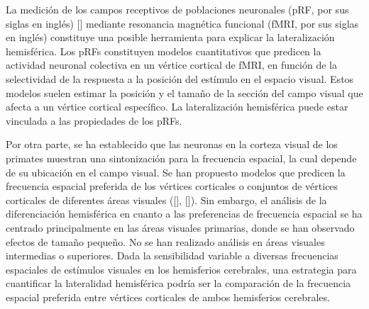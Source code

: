 

La medición de los campos receptivos de poblaciones neuronales (pRF, por sus siglas en ingl\'es) [\cite{dumoulin_population_2008}] mediante resonancia magnética funcional (fMRI, por sus siglas en ingl\'es) constituye una posible herramienta para explicar la lateralización hemisférica. Los pRFs constituyen modelos cuantitativos que predicen la actividad neuronal colectiva en un v\'ertice cortical de fMRI, en función de la selectividad de la respuesta a la posición del estímulo en el espacio visual. Estos modelos suelen estimar la posición y el tamaño de la sección del campo visual que afecta a un v\'ertice cortical específico. La lateralización hemisférica puede estar vinculada a las propiedades de los pRFs.

Por otra parte, se ha establecido que las neuronas en la corteza visual de los primates muestran una sintonización para la frecuencia espacial, la cual depende de su ubicación en el campo visual. Se han propuesto modelos que predicen la frecuencia espacial preferida de los v\'ertices corticales o conjuntos de v\'ertices corticales de diferentes áreas visuales ([\cite{aghajari_population_2020}], [\cite{broderick_mapping_2022}]).
Sin embargo, el an\'alisis de la diferenciación hemisférica en cuanto a las preferencias de frecuencia espacial se ha centrado principalmente en las áreas visuales primarias, donde se han observado efectos de tamaño pequeño. No se han realizado análisis en áreas visuales intermedias o superiores. Dada la sensibilidad variable a diversas frecuencias espaciales de estímulos visuales en los hemisferios cerebrales, una estrategia para cuantificar la lateralidad hemisférica podría ser la comparación de la frecuencia espacial preferida entre v\'ertices corticales de ambos hemisferios cerebrales. 

